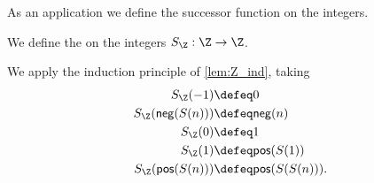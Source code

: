 As an application we define the successor function on the integers.

\begin{defn}
We define the  on the integers $S_\Z:\Z\to\Z$.
\end{defn}

\begin{constr}
We apply the induction principle of \autoref{lem:Z_ind}, taking
\begin{align*}
S_\Z(-1) & \defeq 0 \\
S_\Z(\mathsf{neg}(S(n))) & \defeq \mathsf{neg}(n) \\
S_\Z(0) & \defeq 1 \\
S_\Z(1) & \defeq \mathsf{pos}(S(1)) \\
S_\Z(\mathsf{pos}(S(n))) & \defeq \mathsf{pos}(S(S(n))).
\end{align*}
\end{constr}

